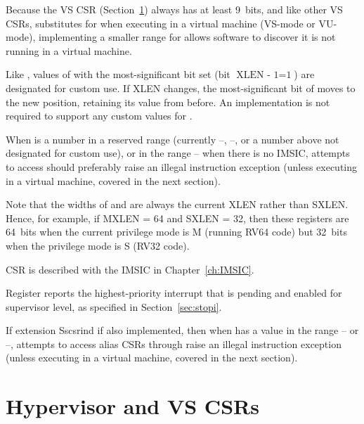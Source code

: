 \begin{commentary}
Because the VS CSR  (Section~\ref{ch:CSRs-hypervisor})
always has at least 9~bits, and like other VS CSRs, 
substitutes for  when executing in a virtual machine
(\mbox{VS-mode} or \mbox{VU-mode}), implementing a smaller range for
 allows software to discover it is not running in a virtual
machine.
\end{commentary}

Like , values of  with the most-significant bit
set (bit $\mbox{XLEN - 1} = \mbox{1}$) are designated for custom use.
If XLEN changes, the most-significant bit of  moves to
the new position, retaining its value from before.
An implementation is not required to support any custom values for
.

When  is a number in a reserved range (currently
--, --, or a number above 
not designated for custom use), or in the range --
when there is no IMSIC, attempts to access 
should preferably raise an illegal
instruction exception (unless executing in a virtual machine, covered
in the next section).

Note that the widths of  and 
are always the current XLEN rather than SXLEN\@.
Hence, for example, if MXLEN = 64 and SXLEN = 32, then these registers
are 64~bits when the current privilege mode is M (running RV64 code)
but 32~bits when the privilege mode is S (RV32 code).

CSR  is described with the IMSIC in Chapter~\ref{ch:IMSIC}.

Register  reports the highest-priority interrupt that
is pending and enabled for supervisor level, as specified in
Section~\ref{sec:stopi}.

If extension Sscsrind if also implemented, then when 
has a value in the range -- or --,
attempts to access alias CSRs  through 
raise an illegal instruction exception (unless executing
in a virtual machine, covered in the next section).

\section{Hypervisor and VS CSRs}
\label{ch:CSRs-hypervisor}

